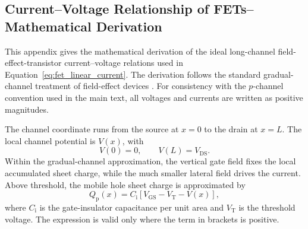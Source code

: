 \begin{appendix}

\chapter{Current–Voltage Relationship of FETs--Mathematical Derivation}
\label{app:iv_FET}
\thispagestyle{plain}

This appendix gives the mathematical derivation of the ideal long-channel
field-effect-transistor current--voltage relations used in
Equation~\eqref{eq:fet_linear_current}. The derivation follows the standard
gradual-channel treatment of field-effect devices \cite{Neamen}. For consistency
with the $p$-channel convention used in the main text, all voltages and currents
are written as positive magnitudes.

The channel coordinate runs from the source at $x=0$ to the drain at $x=L$.
The local channel potential is $V(x)$, with
\begin{equation}
    V(0)=0,
    \qquad
    V(L)=V_\mathrm{DS}.
    \label{eq:app_fet_boundary_potentials}
\end{equation}
Within the gradual-channel approximation, the vertical gate field fixes the
local accumulated sheet charge, while the much smaller lateral field drives the
current. Above threshold, the mobile hole sheet charge is approximated by
\begin{equation}
    Q_\mathrm{p}(x)
    =C_\mathrm{i}\left[V_\mathrm{GS}-V_\mathrm{T}-V(x)\right],
    \label{eq:app_fet_sheet_charge}
\end{equation}
where $C_\mathrm{i}$ is the gate-insulator capacitance per unit area and
$V_\mathrm{T}$ is the threshold voltage. The expression is valid only where the
term in brackets is positive.


\end{appendix}
